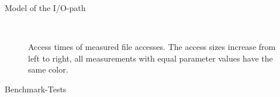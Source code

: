 \documentclass[final]{beamer}
\newlength{\onecolwid}
\begin{document}
\begin{frame}[t]
\begin{columns}[t]
\begin{column}{\onecolwid}
\begin{block}{Model of the I/O-path}
	\begin{figure}
		\\
		\caption{Access times of measured file accesses. The access sizes increase from left to right, all measurements with equal parameter values have the same color.}
		\label{exploration}
	\end{figure} 
	
	
	
\end{block}

\vspace*{-2cm}
\begin{block}{Benchmark-Tests}
	

\end{block}
\end{column}
\end{columns}
\end{frame}
\end{document}
